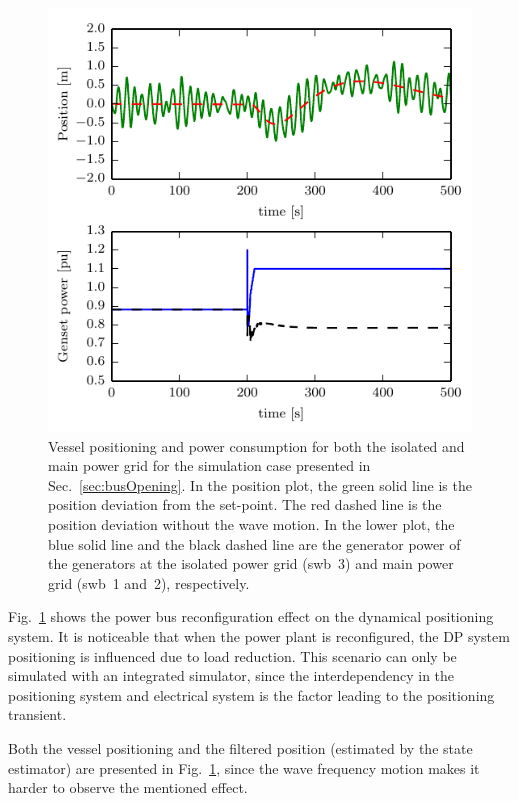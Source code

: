 \documentclass[journal]{IEEEtran}
\begin{document}
\begin{figure}
\includegraphics[width=\columnwidth,clip]{figures/busIsolation}
\caption{Vessel positioning and power consumption for both the isolated and main power grid for the simulation case presented in Sec.~\ref{sec:busOpening}. In the position plot, the green solid line is the position deviation from the set-point. The red dashed line is the position deviation without the wave motion. In the lower plot, the blue solid line and the black dashed line are the generator power of the generators at the isolated power grid (swb~3) and main power grid (swb~1 and~2), respectively.}
\label{fig:busPosition}
\end{figure}

Fig.~\ref{fig:busPosition} shows the power bus reconfiguration effect on the dynamical positioning system. It is noticeable that when the power plant is reconfigured, the DP system positioning is influenced due to load reduction.
This scenario can only be simulated with an integrated simulator, since the interdependency in the positioning system and electrical system is the factor leading to the positioning transient.

Both the vessel positioning and the filtered position (estimated by the state estimator) are presented in Fig.~\ref{fig:busPosition}, since the wave frequency motion makes it harder to observe the mentioned effect.
\end{document}
